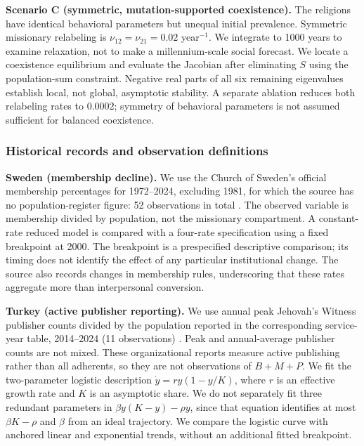\textbf{Scenario C (symmetric, mutation-supported coexistence).}
The religions have identical behavioral parameters but unequal initial prevalence. Symmetric missionary relabeling is $\nu_{12}=\nu_{21}=0.02$ year$^{-1}$. We integrate to 1000 years to examine relaxation, not to make a millennium-scale social forecast. We locate a coexistence equilibrium and evaluate the Jacobian after eliminating $S$ using the population-sum constraint. Negative real parts of all six remaining eigenvalues establish local, not global, asymptotic stability. A separate ablation reduces both relabeling rates to $0.0002$; symmetry of behavioral parameters is not assumed sufficient for balanced coexistence.

\subsubsection{Historical records and observation definitions}
\label{subsec:hist_fit}
\textbf{Sweden (membership decline).}
We use the Church of Sweden's official membership percentages for 1972--2024, excluding 1981, for which the source has no population-register figure: 52 observations in total \cite{svenskakyrkan_membership_1972_2024}. The observed variable is membership divided by population, not the missionary compartment. A constant-rate reduced model is compared with a four-rate specification using a fixed breakpoint at 2000. The breakpoint is a prespecified descriptive comparison; its timing does not identify the effect of any particular institutional change. The source also records changes in membership rules, underscoring that these rates aggregate more than interpersonal conversion.

\textbf{Turkey (active publisher reporting).}
We use annual peak Jehovah's Witness publisher counts divided by the population reported in the corresponding service-year table, 2014--2024 (11 observations) \cite{jw_service_year_report_2024,jw_country_reports_2024,jw_historical_reports,upstream_code}. Peak and annual-average publisher counts are not mixed. These organizational reports measure active publishing rather than all adherents, so they are not observations of $B+M+P$. We fit the two-parameter logistic description $\dot y=r y(1-y/K)$, where $r$ is an effective growth rate and $K$ is an asymptotic share. We do not separately fit three redundant parameters in $\beta y(K-y)-\rho y$, since that equation identifies at most $\beta K-\rho$ and $\beta$ from an ideal trajectory. We compare the logistic curve with anchored linear and exponential trends, without an additional fitted breakpoint.

